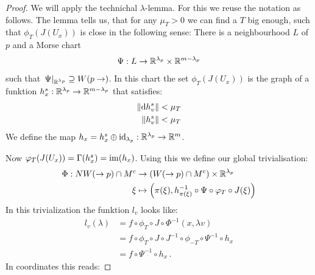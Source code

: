 	\begin{proof}
		We will apply the technichal $\lambda$-lemma. For this we reuse the notation as follows. The lemma tells us, that for any $\mu_T>0$ we can find a $T$ big enough, such that $\phi_T(J(U_x))$ is close in the following sense: There is a neighbourhood $L$ of $p$ and a Morse chart 
		\begin{align*}
			\Psi: L\to \mathbb{R}^{\lambda_p}\times \mathbb{R}^{m-\lambda_p}
		\end{align*} such that $\left.\Psi\right|_{\mathbb{R}^{\lambda_p}}\supseteq W(p\to)$. In this chart the set $\phi_T(J(U_x))$ is the graph of a funktion $h^s_x:\mathbb{R}^{\lambda_p}\to \mathbb{R}^{m-\lambda_p}$ that satisfies:
		\begin{align*}
			\left\lVert\mathop{}\!\mathrm{d} h^s_v\right\rVert<\mu_T\\ 
			\left\lVert h^s_v\right\rVert<\mu_T
		\end{align*}
		We define the map $h_x=h^s_x\oplus \operatorname{\text{id}}_{\lambda_p}: \mathbb{R}^{\lambda_p}\to \mathbb{R}^m$.
		
		
		
		
		
		 Now $\varphi_T(J(U_x))=\Gamma(h^s_x)=\mathrm{im} (h_x)$. Using this we define our global trivialisation:
		\begin{align*}
			\Phi: NW(\to p)\cap M^c &\to  \left(W(\to p)\cap M^c\right)\times \mathbb{R}^{\lambda_p}\\
			\xi &\mapsto \left(\pi(\xi), h^{-1}_{\pi(\xi)}\circ \Psi \circ \varphi_T \circ J(\xi)\right)
		\end{align*}
		In this trivialization the funktion $l_v$ looks like:
		\begin{align*}
			l_v(\lambda)
			&=f \circ \phi_T\circ J \circ \Phi^{-1} (x,\lambda v)\\
			&=f \circ \phi_T\circ J\circ J^{-1}\circ \phi_{-T}\circ \Psi^{-1} \circ h_x\\
			&=f \circ \Psi^{-1} \circ h_x\, .
		\end{align*} 
		In coordinates this reads:
	
		
		

\end{proof}
